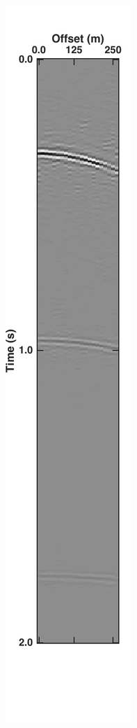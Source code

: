 \begin{figure}
\begin{subfigure}[t]{0.24\textwidth}
		\caption{}
		\label{fig:Ch-Results-Debl-inline10-x}
	\end{subfigure}
	\centering
	\begin{subfigure}[t]{0.24\textwidth}
		\centering
		\includegraphics[height = 0.38\textheight]{Plots/BlendingPatterns/Deblended_xline10t}

\end{subfigure}
\end{figure}
